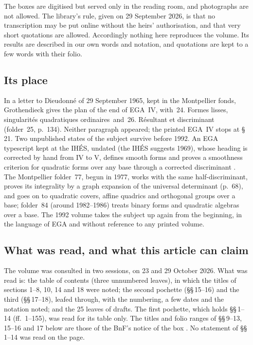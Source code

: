 \documentclass[11pt,a4paper]{amsart}
\newcommand{\q}[1]{\guillemotleft\,#1\,\guillemotright}
\theoremstyle{plain}
\theoremstyle{definition}
\begin{document}
The boxes are digitised but served only in the reading room, and photographs are not allowed. The library's rule, given on 29 September 2026, is that no transcription may be put online without the heirs' authorisation, and that very short quotations are allowed. Accordingly nothing here reproduces the volume. Its results are described in our own words and notation, and quotations are kept to a few words with their folio.

\subsection{Its place}
In a letter to Dieudonné of 29 September 1965, kept in the Montpellier fonds, Grothendieck gives the plan of the end of EGA~IV, with \q{24. Formes lisses, singularités quadratiques ordinaires} and \q{26. Résultant et discriminant} (folder~25, p.~134). Neither paragraph appeared; the printed EGA~IV stops at \S\,21. Two unpublished states of the subject survive before 1992. An EGA typescript kept at the IHÉS, undated (the IHÉS suggests 1969), whose heading is corrected by hand from IV to V, defines smooth forms and proves a smoothness criterion for quadratic forms over any base through a corrected discriminant \cite{ihes}. The Montpellier folder~77, begun in 1977, works with the same half-discriminant, proves its integrality by a graph expansion of the universal determinant (p.~68), and goes on to quadratic covers, affine quadrics and orthogonal groups over a base; folder~84 (around 1982--1986) treats binary forms and quadratic algebras over a base. The 1992 volume takes the subject up again from the beginning, in the language of EGA and without reference to any printed volume.

\subsection{What was read, and what this article can claim}\label{sub:evidence}
The volume was consulted in two sessions, on 23 and 29 October 2026. What was read is: the table of contents (three unnumbered leaves), in which the titles of sections 1--8, 10, 14 and 18 were noted; the second pochette (\S\S\,15--16) and the third (\S\S\,17--18), leafed through, with the numbering, a few dates and the notation noted; and the 25 leaves of drafts. The first pochette, which holds \S\S\,1--14 (ff.~1--155), was read for its table only. The titles and folio ranges of \S\S\,9--13, 15--16 and 17 below are those of the BnF's notice of the box \cite{bnf-notice}. No statement of \S\S\,1--14 was read on the page.
\end{document}
